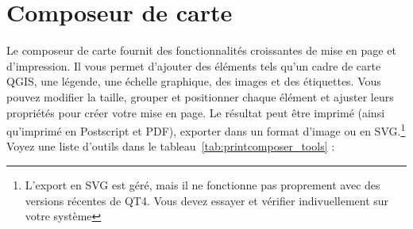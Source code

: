 \section{Composeur de carte}\label{label_printcomposer}


Le composeur de carte fournit des fonctionnalités croissantes de mise en page et
d'impression. Il vous permet d'ajouter des éléments tels qu'un cadre de carte
QGIS, une légende, une échelle graphique, des images et des étiquettes. Vous
pouvez modifier la taille, grouper et positionner chaque élément et ajuster
leurs propriétés pour créer votre mise en page. Le résultat peut être imprimé
(ainsi qu'imprimé en Postscript et PDF), exporter dans un format d'image ou en
SVG.\footnote{L'export en SVG est géré, mais il ne fonctionne pas proprement
avec des versions récentes de QT4. Vous devez essayer et vérifier
indivuellement sur votre système} Voyez une liste d'outils dans le
tableau~\ref{tab:printcomposer_tools} :

